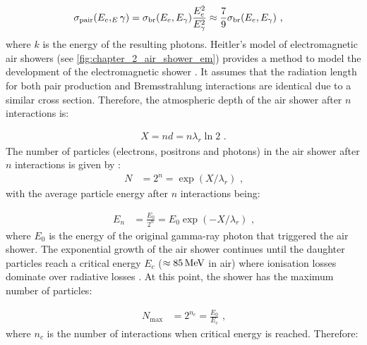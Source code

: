\begin{equation}
    \begin{aligned}
    \sigma_\text{pair}\qty(E_e,_E\gamma)&=\sigma_\text{br}\qty(E_e,E_\gamma)\frac{E_e^2}{E_\gamma^2}\approx \frac{7}{9}\sigma_\text{br}\qty(E_e,E_\gamma)\text{ ,}
    \end{aligned} \label{eq:chapter_2_pair_prod_cs}
\end{equation}
where $k$ is the energy of the resulting photons.
\newpar 
Heitler's model of electromagnetic air showers (see \autoref{fig:chapter_2_air_shower_em}) provides a method to model the development of the electromagnetic shower \citep{1934RSPSA.146...83B}. It assumes that the radiation length for both pair production and Bremsstrahlung interactions are identical due to a similar cross section. Therefore, the atmospheric depth of the air shower after $n$ interactions is:

\begin{equation}
    \begin{aligned}
    X=nd=n\lambda_r\ln 2\text{ .}
    \end{aligned} \label{eq:chapter_2_gas_depth}
\end{equation}
\noindent The number of particles (electrons, positrons and photons) in the air shower after $n$ interactions is given by \citep{MATTHEWS2005387}:
\begin{equation}
    \begin{aligned}
    N&=2^n=\exp(X/\lambda_r)\text{ ,}
    \end{aligned}
\end{equation}
\noindent with the average particle energy after $n$ interactions being:

\begin{equation}
    \begin{aligned}
    E_n&=\frac{E_0}{2^n}=E_0\exp(-X/\lambda_r)\text{ ,}
    \end{aligned}
\end{equation}
\noindent where $E_0$ is the energy of the original gamma-ray photon that triggered the air shower.
\newpar 
The exponential growth of the air shower continues until the daughter particles reach a critical energy $E_c$ ($\approx 85\,\si{\mega\electronvolt}$ in air) where ionisation losses dominate over radiative losses \citep{1954qtr..book.....H}. At this point, the shower has the maximum number of particles:

\begin{equation}
    \begin{aligned}
    N_\text{max}&=2^{n_c} = \frac{E_0}{E_c}\text{ ,}
    \end{aligned} \label{eq:chapter_1_gas_max_particles} 
\end{equation}
\noindent where $n_c$ is the number of interactions when critical energy is reached. Therefore:

